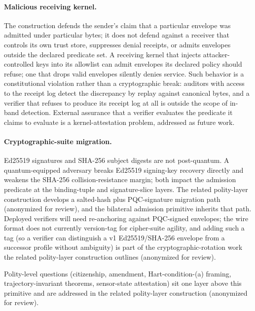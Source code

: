 \paragraph{Malicious receiving kernel.} The construction defends the sender's claim that a particular envelope was admitted under particular bytes; it does not defend against a receiver that controls its own trust store, suppresses denial receipts, or admits envelopes outside the declared predicate set. A receiving kernel that injects attacker-controlled keys into its allowlist can admit envelopes its declared policy should refuse; one that drops valid envelopes silently denies service. Such behavior is a constitutional violation rather than a cryptographic break: auditors with access to the receipt log detect the discrepancy by replay against canonical bytes, and a verifier that refuses to produce its receipt log at all is outside the scope of in-band detection. External assurance that a verifier evaluates the predicate it claims to evaluate is a kernel-attestation problem, addressed as future work.

\paragraph{Cryptographic-suite migration.} Ed25519 signatures and SHA-256 subject digests are not post-quantum. A quantum-equipped adversary breaks Ed25519 signing-key recovery directly and weakens the SHA-256 collision-resistance margin; both impact the admission predicate at the binding-tuple and signature-slice layers. The related polity-layer construction develops a salted-hash plus PQC-signature migration path (anonymized for review), and the bilateral admission primitive inherits that path. Deployed verifiers will need re-anchoring against PQC-signed envelopes; the wire format does not currently version-tag for cipher-suite agility, and adding such a tag (so a verifier can distinguish a v1 Ed25519/SHA-256 envelope from a successor profile without ambiguity) is part of the cryptographic-rotation work the related polity-layer construction outlines (anonymized for review).

Polity-level questions (citizenship, amendment, Hart-condition-(a) framing, trajectory-invariant theorems, sensor-state attestation) sit one layer above this primitive and are addressed in the related polity-layer construction (anonymized for review).
